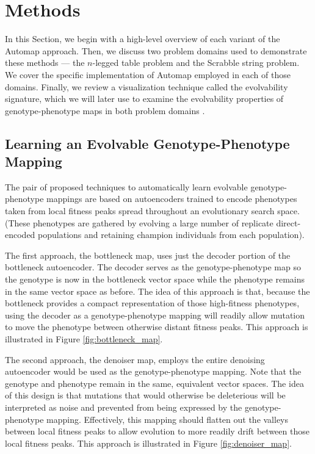 \section{Methods} \label{sec:methods}

In this Section, we begin with a high-level overview of each variant of the Automap approach.
Then, we discuss two problem domains used to demonstrate these methods --- the $n$-legged table problem and the Scrabble string problem.
We cover the specific implementation of Automap employed in each of those domains.
Finally, we review a visualization technique called the evolvability signature, which we will later use to examine the evolvability properties of genotype-phenotype maps in both problem domains  \cite{tarapore2015evolvability}.

\subsection{Learning an Evolvable Genotype-Phenotype Mapping}

The pair of proposed techniques to automatically learn evolvable genotype-phenotype mappings are based on autoencoders trained to encode phenotypes taken from local fitness peaks spread throughout an evolutionary search space.
(These phenotypes are gathered by evolving a large number of replicate direct-encoded populations and retaining champion individuals from each population).



The first approach, the bottleneck map, uses just the decoder portion of the bottleneck autoencoder.
The decoder serves as the genotype-phenotype map so the genotype is now in the bottleneck vector space while the phenotype remains in the same vector space as before.
The idea of this approach is that, because the bottleneck provides a compact representation of those high-fitness phenotypes, using the decoder as a genotype-phenotype mapping will readily allow mutation to move the phenotype between otherwise distant fitness peaks.
This approach is illustrated in Figure \ref{fig:bottleneck_map}.



The second approach, the denoiser map, employs the entire denoising autoencoder would be used as the genotype-phenotype mapping.
Note that the genotype and phenotype remain in the same, equivalent vector spaces.
The idea of this design is that mutations that would otherwise be deleterious will be interpreted as noise and prevented from being expressed by the genotype-phenotype mapping.
Effectively, this mapping should flatten out the valleys between local fitness peaks to allow evolution to more readily drift between those local fitness peaks.
This approach is illustrated in Figure \ref{fig:denoiser_map}.

